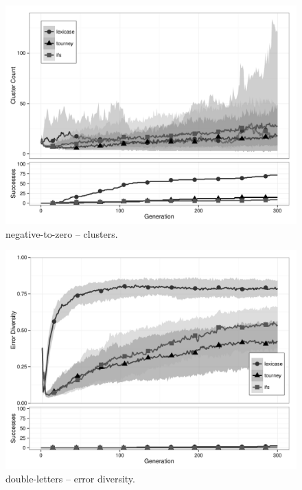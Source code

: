 \begin{figure}%
\centering
\includegraphics[width=11.5cm]{negative-to-zero-cluster.pdf}
\caption{negative-to-zero -- clusters.}
\label{negative-to-zeroClu}
\end{figure}

\begin{figure}%
\centering
\includegraphics[width=11.5cm]{double-letters-diversity.pdf}
\caption{double-letters -- error diversity.}
\label{double-lettersDiv}
\end{figure}

